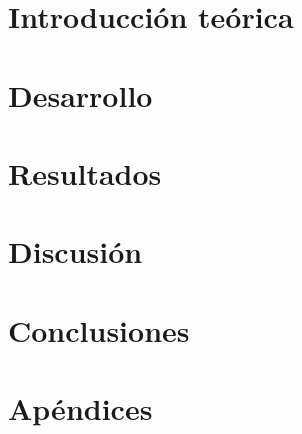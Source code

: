 \documentclass[a4paper,10pt, nofootinbib]{article}
\begin{document}
\maketitle
\section{Introducción teórica}

\section{Desarrollo}

\section{Resultados}

\section{Discusión}

\section{Conclusiones}

\section{Apéndices}

\end{document}
